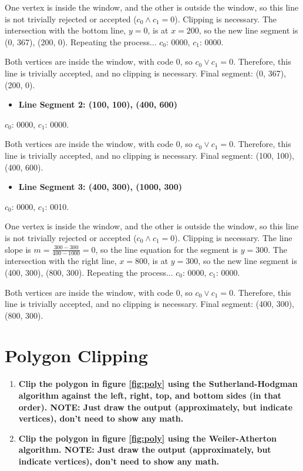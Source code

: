 \documentclass[12pt]{article}
\begin{document}
    One vertex is inside the window, and the other is outside the window, so this line is not trivially rejected or accepted ($c_0 \land c_1 = 0$). Clipping is necessary. The intersection with the bottom line, $y=0$, is at $x=200$, so the new line segment is (0, 367), (200, 0). Repeating the process...
	\bigbreak
	$c_0$: 0000, \hspace{1cm} $c_1$: 0000.
    
    Both vertices are inside the window, with code 0, so $c_0  \lor  c_1 = 0$. Therefore, this line is trivially accepted, and no clipping is necessary. Final segment: (0, 367), (200, 0).

    
\begin{itemize}
\item \textbf{ Line Segment 2: (100, 100), (400, 600)}
\end{itemize}
	$c_0$: 0000, \hspace{1cm} $c_1$: 0000.
    
    Both vertices are inside the window, with code 0, so $c_0  \lor  c_1 = 0$. Therefore, this line is trivially accepted, and no clipping is necessary. Final segment: (100, 100), (400, 600).

\begin{itemize}
\item \textbf{ Line Segment 3: (400, 300), (1000, 300)}
\end{itemize}
	$c_0$: 0000, \hspace{1cm} $c_1$: 0010.
	
    One vertex is inside the window, and the other is outside the window, so this line is not trivially rejected or accepted ($c_0 \land c_1 = 0$). Clipping is necessary. The line slope is $m=\frac{300-300}{400-1000}= 0$, so the line equation for the segment is $y = 300$. The intersection with the right line, $x=800$, is at $y=300$, so the new line segment is (400, 300), (800, 300). Repeating the process...
	\bigbreak
	$c_0$: 0000, \hspace{1cm} $c_1$: 0000.
    
    Both vertices are inside the window, with code 0, so $c_0  \lor  c_1 = 0$. Therefore, this line is trivially accepted, and no clipping is necessary. Final segment: (400, 300), (800, 300).

\section{Polygon Clipping}
\begin{enumerate}
\item  \textbf{Clip the polygon in figure \ref{fig:poly} using the Sutherland-Hodgman algorithm against the left, right, top, and bottom sides (in that order). NOTE: Just draw the output (approximately, but indicate vertices), don't need to show any math.}
\item \textbf{Clip the polygon in figure \ref{fig:poly} using the Weiler-Atherton algorithm. NOTE: Just draw the output (approximately, but indicate vertices), don't need to show any math.}
\end{enumerate}
\end{document}
